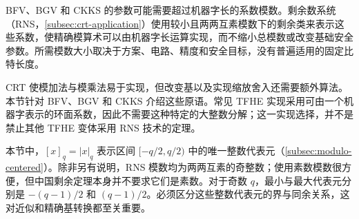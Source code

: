BFV、BGV 和 CKKS 的参数可能需要超过机器字长的系数模数。剩余数系统（RNS，\autoref{subsec:crt-application}）使用较小且两两互素模数下的剩余类来表示这些系数，使精确模算术可以由机器字长运算实现，而不缩小总模数或改变基础安全参数。所需模数大小取决于方案、电路、精度和安全目标，没有普遍适用的固定比特长度。

CRT 使模加法与模乘法易于实现，但改变基以及实现缩放舍入还需要额外算法。本节针对 BFV、BGV 和 CKKS 介绍这些原语。常见 TFHE 实现采用可由一个机器字表示的环面系数，因此不需要这种特定的大整数分解；这一实现选择，并不是禁止其他 TFHE 变体采用 RNS 技术的定理。

本节中，$[x]_q=|x|_q$ 表示区间 $[-q/2,q/2)$ 中的唯一整数代表元（\autoref{subsec:modulo-centered}）。除非另有说明，RNS 模数均为两两互素的奇整数；使用素数模数很方便，但中国剩余定理本身并不要求它们是素数。对于奇数 $q$，最小与最大代表元分别是 $-(q-1)/2$ 和 $(q-1)/2$。必须区分这些整数代表元的界与同余关系，这对近似和精确基转换都至关重要。

